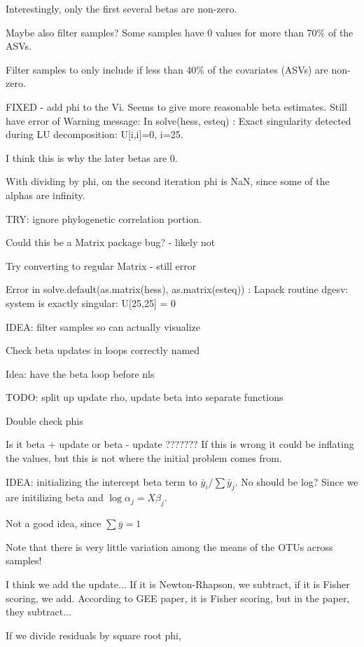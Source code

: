 \documentclass[10pt]{article}
\begin{document}
Interestingly, only the first several betas are non-zero.


Maybe also filter samples? Some samples have 0 values for more than 70\% of the ASVs.

Filter samples to only include if less than 40\% of the covariates (ASVs) are non-zero.


FIXED - add phi to the Vi. Seems to give more reasonable beta estimates. Still have error of Warning message:
In solve(hess, esteq) :
  Exact singularity detected during LU decomposition: U[i,i]=0, i=25.

I think this is why the later betas are 0.


With dividing by phi, on the second iteration phi is NaN, since some of the alphas are infinity.




TRY: ignore phylogenetic correlation portion.


Could this be a Matrix package bug? - likely not

Try converting to regular Matrix - still error

Error in solve.default(as.matrix(hess), as.matrix(esteq)) :
  Lapack routine dgesv: system is exactly singular: U[25,25] = 0

IDEA: filter samples so can actually visualize


Check beta updates in loops correctly named

Idea: have the beta loop before nls

TODO: split up update rho, update beta into separate functions

Double check phis

Is it beta + update or beta - update ???????
If this is wrong it could be inflating the values, but this is not where the initial problem comes from.



IDEA: initializing the intercept beta term to $\bar y_i/\sum \bar y_j$. No should be log? Since we are initilizing beta and $\log \alpha_j = X \beta_j$.

Not a good idea, since $\sum \bar y = 1$

Note that there is very little variation among the means of the OTUs across samples!

I think we add the update...
If it is Newton-Rhapson, we subtract, if it is Fisher scoring, we add.
According to GEE paper, it is Fisher scoring, but in the paper, they subtract...


If we divide residuals by square root phi,
\end{document}
